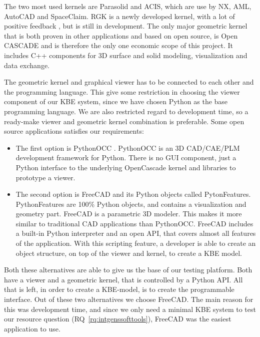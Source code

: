The two most used kernels are Parasolid and ACIS, which are use by NX, AML, AutoCAD and SpaceClaim. RGK is a newly developed kernel, with a lot of positive feedback \citep{RGK}, but is still in development. The only major geometric kernel that is both proven in other applications and based on open source, is Open CASCADE and is therefore the only one economic scope of this project. It includes C++ components for 3D surface and solid modeling, visualization and data exchange.

The geometric kernel and graphical viewer has to be connected to each other and the programming language. This give some restriction in choosing the viewer component of our KBE system, since we have chosen Python as the base programming language. We are also restricted regard to development time, so a ready-make viewer and geometric kernel combination is preferable. Some open source applications satisfies our requirements:

\begin{itemize}
  \item The first option is PythonOCC \citep{OCC}. PythonOCC is an 3D CAD/CAE/PLM development framework for Python. There is no GUI component, just a Python interface to the underlying OpenCascade kernel and libraries to prototype a viewer.

  \item The second option is FreeCAD \citep{FreeCAD} and its Python objects called PytonFeatures. PythonFeatures are 100\% Python objects, and contains a visualization and geometry part. FreeCAD is a parametric 3D modeler. This makes it more similar to traditional CAD applications than PythonOCC. FreeCAD includes a built-in Python interpreter and an open API, that covers almost all features of the application. With this scripting feature, a developer is able to create an object structure, on top of the viewer and kernel, to create a KBE model.
\end{itemize}

Both these alternatives are able to give us the base of our testing platform. Both have a viewer and a geometric kernel, that is controlled by a Python API. All that is left, in order to create a KBE-model, is to create the programmable interface. Out of these two alternatives we choose FreeCAD. The main reason for this was development time, and since we only need a minimal KBE system to test our resource question (RQ~\ref{rq:intgenssofttools}), FreeCAD was the easiest application to use.


